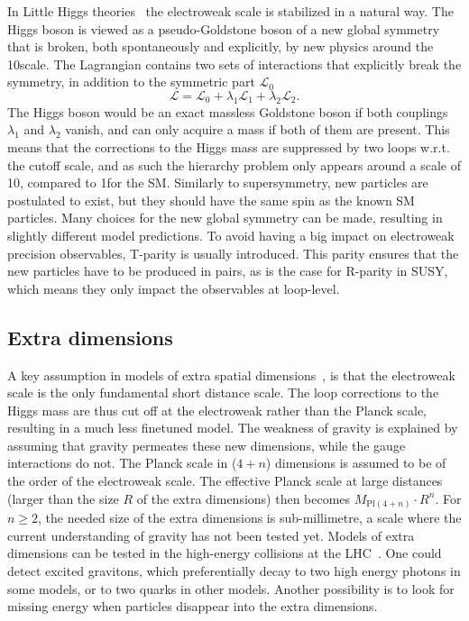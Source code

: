 In Little Higgs theories~\cite{Cheng:2007bu,Reuter:2012sd,Schmaltz:2005ky} the electroweak scale is
stabilized in a natural way. 
The Higgs boson is viewed as a pseudo-Goldstone boson of a new global symmetry that is broken,
both spontaneously and explicitly, by new physics around the 10\TeV scale. 
The Lagrangian contains two sets of interactions that explicitly break the symmetry, in addition to
the symmetric part $\mathcal{L}_0$
\begin{equation}
  \mathcal{L} = \mathcal{L}_0 + \lambda_1 \mathcal{L}_1 + \lambda_2 \mathcal{L}_2 .
\end{equation}
The Higgs boson would be an exact massless Goldstone boson if both couplings $\lambda_1$ and
$\lambda_2$ vanish, and can only acquire a mass if both of them are present. This means that
the corrections to the Higgs mass are suppressed by two loops w.r.t. the cutoff scale, and as such
the hierarchy problem only appears around a scale of 10\TeV, compared to 1\TeV for the SM. 
Similarly to supersymmetry, new particles are postulated to exist, but they should have the same 
spin as the known SM particles. 
Many choices for the new global symmetry can be made, resulting in slightly different model
predictions. To avoid having a big impact on electroweak precision observables, T-parity is usually
introduced. This parity ensures that the new particles have to be produced in pairs, as is the case
for R-parity in SUSY, which means they only impact the observables at loop-level. 

\subsection{Extra dimensions \label{sec:extra_dimensions}}

A key assumption in models of extra spatial dimensions~\cite{ArkaniHamed:1998rs}, is that the
electroweak scale is the only fundamental short distance scale. The loop corrections to the Higgs
mass are thus cut off at the electroweak rather than the Planck scale, resulting in a much less
finetuned model.  
The weakness of gravity is explained by assuming that gravity permeates these new dimensions, while
the gauge interactions do not. 
The Planck scale in ($4+n$) dimensions is assumed to be of the order of the electroweak scale.  
The effective Planck scale at large distances (larger than the size $R$ of the extra dimensions)
then becomes $M_{\text{Pl}(4+n)}\cdot R^n$. For $n\geq 2$, the needed size of the extra dimensions
is sub-millimetre, a scale where the current understanding of gravity has not been tested yet. 
Models of extra dimensions can be tested in the high-energy collisions at the
LHC~\cite{Chatrchyan:2011fq}. One could detect excited gravitons, which preferentially decay to two
high energy photons in some models, or to two quarks in other models. Another possibility is to
look for missing energy when particles disappear into the extra
dimensions. 
